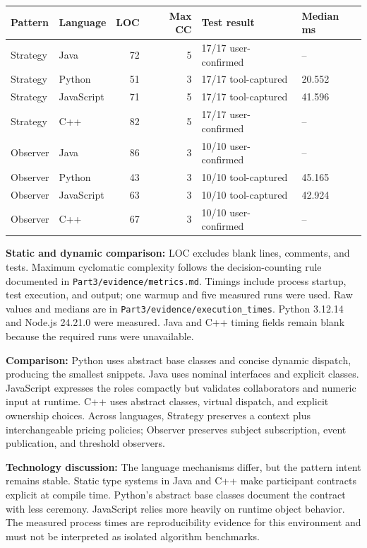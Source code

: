 \documentclass[11pt,a4paper]{article}
\newcommand{\entry}[2]{\textbf{#1:} #2\par}
\newcommand{\codepath}[1]{\nolinkurl{#1}}
\begin{document}
\begin{center}
\small
\begin{tabular}{@{}llrrll@{}}
\toprule
Pattern & Language & LOC & Max CC & Test result & Median ms\\
\midrule
Strategy & Java & 72 & 5 & 17/17 user-confirmed & --\\
Strategy & Python & 51 & 3 & 17/17 tool-captured & 20.552\\
Strategy & JavaScript & 71 & 5 & 17/17 tool-captured & 41.596\\
Strategy & C++ & 82 & 5 & 17/17 user-confirmed & --\\
Observer & Java & 86 & 3 & 10/10 user-confirmed & --\\
Observer & Python & 43 & 3 & 10/10 tool-captured & 45.165\\
Observer & JavaScript & 63 & 3 & 10/10 tool-captured & 42.924\\
Observer & C++ & 67 & 3 & 10/10 user-confirmed & --\\
\bottomrule
\end{tabular}
\end{center}

\entry{Static and dynamic comparison}{LOC excludes blank lines, comments, and tests. Maximum cyclomatic complexity follows the decision-counting rule documented in \codepath{Part3/evidence/metrics.md}. Timings include process startup, test execution, and output; one warmup and five measured runs were used. Raw values and medians are in \codepath{Part3/evidence/execution_times}. Python 3.12.14 and Node.js 24.21.0 were measured. Java and C++ timing fields remain blank because the required runs were unavailable.}
\entry{Comparison}{Python uses abstract base classes and concise dynamic dispatch, producing the smallest snippets. Java uses nominal interfaces and explicit classes. JavaScript expresses the roles compactly but validates collaborators and numeric input at runtime. C++ uses abstract classes, virtual dispatch, and explicit ownership choices. Across languages, Strategy preserves a context plus interchangeable pricing policies; Observer preserves subject subscription, event publication, and threshold observers.}
\entry{Technology discussion}{The language mechanisms differ, but the pattern intent remains stable. Static type systems in Java and C++ make participant contracts explicit at compile time. Python's abstract base classes document the contract with less ceremony. JavaScript relies more heavily on runtime object behavior. The measured process times are reproducibility evidence for this environment and must not be interpreted as isolated algorithm benchmarks.}
\end{document}
